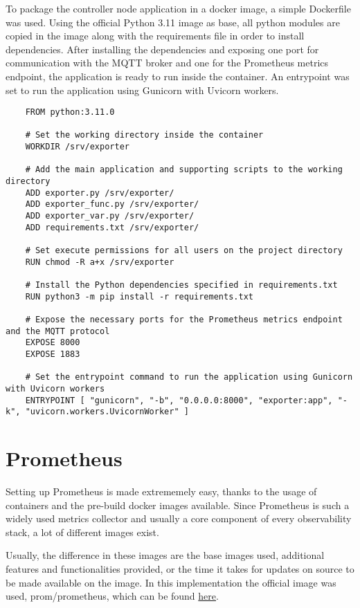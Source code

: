 To package the controller node application in a docker image, a simple Dockerfile was used. Using the official Python 3.11 image as base, all python modules are copied in the image along with the requirements file in order to install dependencies. After installing the dependencies and exposing one port for communication with the MQTT broker and one for the Prometheus metrics endpoint, the application is ready to run inside the container. An entrypoint was set to run the application using Gunicorn with Uvicorn workers.

\begin{verbatim}
    FROM python:3.11.0

    # Set the working directory inside the container
    WORKDIR /srv/exporter

    # Add the main application and supporting scripts to the working directory
    ADD exporter.py /srv/exporter/
    ADD exporter_func.py /srv/exporter/
    ADD exporter_var.py /srv/exporter/
    ADD requirements.txt /srv/exporter/

    # Set execute permissions for all users on the project directory
    RUN chmod -R a+x /srv/exporter

    # Install the Python dependencies specified in requirements.txt
    RUN python3 -m pip install -r requirements.txt

    # Expose the necessary ports for the Prometheus metrics endpoint and the MQTT protocol
    EXPOSE 8000
    EXPOSE 1883

    # Set the entrypoint command to run the application using Gunicorn with Uvicorn workers
    ENTRYPOINT [ "gunicorn", "-b", "0.0.0.0:8000", "exporter:app", "-k", "uvicorn.workers.UvicornWorker" ]
\end{verbatim}

\section{Prometheus}
Setting up Prometheus is made extrememely easy, thanks to the usage of containers and the pre-build docker images available. Since Prometheus is such a widely used metrics collector and usually a core component of every observability stack, a lot of different images exist.

Usually, the difference in these images are the base images used, additional features and functionalities provided, or the time it takes for updates on source to be made available on the image. In this implementation the official image was used, prom/prometheus, which can be found \href{https://hub.docker.com/r/prom/prometheus}{here}.

